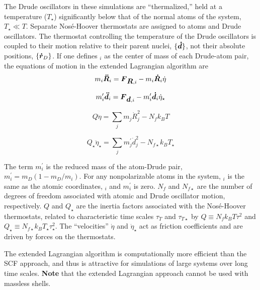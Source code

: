 The Drude oscillators in these simulations are ``thermalized,'' held at a temperature 
($T_{\star}$) significantly below that of the normal atoms of the system, $T_{\star} \ll T$.
Separate Nos\'e-Hoover thermostats are assigned to atoms and Drude oscillators.  The thermostat
controlling the temperature of the Drude oscillators is coupled to their motion relative to their
parent nuclei, $\{{\mbox{\boldmath ${\dot d}$}}\}$, not their absolute positions, $\{{\mbox{\boldmath ${\dot r}$}_D}\}$.  If one defines
$_i$ as the center of mass of each Drude-atom pair, the equations of motion in the
extended Lagrangian algorithm are
\begin{equation}
m_i \mbox{\boldmath ${\ddot{R}}$}_i = \mbox{\boldmath ${F}$}_{\mbox{\boldmath ${R}$},i} - m_i \mbox{\boldmath ${\dot R}$}_i \dot{\eta}
\end{equation}

\begin{equation}
m_i^\prime \mbox{\boldmath ${\ddot{d}}$}_i = \mbox{\boldmath ${F}$}_{\mbox{\boldmath ${d}$},i} - m_i^\prime \mbox{\boldmath ${\dot d}$}_i \dot{\eta}_{\star} 
\end{equation}

\begin{equation}
Q {\ddot \eta} = \sum_{j} m_j {\dot R}_j^2 - N_f k_B T
\end{equation}

\begin{equation}
Q_{\star} {\ddot \eta}_{\star} = \sum_{j} m_j^\prime {\dot d}_j^2 - N_{f \star} k_B T_{\star}
\end{equation}

The term $m_i^\prime$ is the reduced mass of the atom-Drude pair, $m_i^\prime = m_D\left(1-m_D/m_i\right)$. 
For any nonpolarizable atoms in the system, $_i$ is the same as the atomic coordinates, $_i$
and $m_i^\prime$ is zero.  $N_f$ and $N_{f \star}$ are the number of degrees of freedom associated
with atomic and Drude oscillator motion, respectively.  $Q$ and $Q_{\star}$ are the inertia
factors associated with the Nos\'e-Hoover thermostats, related to characteristic time
scales $\tau_T$ and $\tau_{T \star}$ by $Q \equiv N_f k_B T \tau^2$ and 
$Q_{\star} \equiv N_{f \star} k_B T_{\star} \tau_{\star}^2$.
The ``velocities'' ${\dot \eta}$ and ${\dot \eta}_{\star}$ act as friction coefficients and are
driven by forces on the thermostats.

The extended Lagrangian algorithm is computationally more efficient than the SCF approach, and
thus is attractive for simulations of large systems over long time scales. {\bf Note} that the
extended Lagrangian approach cannot be used with massless shells. 

